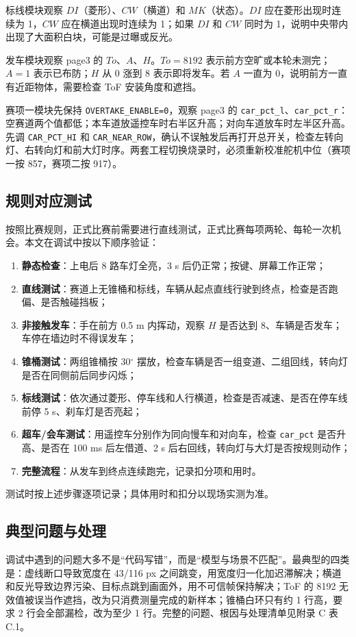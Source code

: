 \documentclass{MaiTechReport}
\begin{document}
标线模块观察 $DI$（菱形）、$CW$（横道）和 $MK$（状态）。$DI$ 应在菱形出现时连续为 1，$CW$ 应在横道出现时连续为 1；如果 $DI$ 和 $CW$ 同时为 1，说明中央带内出现了大面积白块，可能是过曝或反光。

发车模块观察 page3 的 $To$、$A$、$H$。$To=8192$ 表示前方空旷或本轮未测完；$A=1$ 表示已布防；$H$ 从 0 涨到 8 表示即将发车。若 $A$ 一直为 0，说明前方一直有近距物体，需要检查 ToF 安装角度和遮挡。

赛项一模块先保持 \texttt{OVERTAKE\_ENABLE=0}，观察 page3 的 \texttt{car\_pct\_l}、\texttt{car\_pct\_r}：空赛道两个值都低；本车道放遥控车时右半区升高；对向车道放车时左半区升高。先调 \texttt{CAR\_PCT\_HI} 和 \texttt{CAR\_NEAR\_ROW}，确认不误触发后再打开总开关，检查左转向灯、右转向灯和前大灯时序。两套工程切换烧录时，必须重新校准舵机中位（赛项一按 857，赛项二按 917）。

\subsection{规则对应测试}
按照比赛规则，正式比赛前需要进行直线测试，正式比赛每项两轮、每轮一次机会。本文在调试中按以下顺序验证：
\begin{enumerate}
  \item \textbf{静态检查}：上电后 8 路车灯全亮，3 s 后仍正常；按键、屏幕工作正常；
  \item \textbf{直线测试}：赛道上无锥桶和标线，车辆从起点直线行驶到终点，检查是否跑偏、是否触碰挡板；
  \item \textbf{非接触发车}：手在前方 0.5 m 内挥动，观察 $H$ 是否达到 8、车辆是否发车；车停在墙边时不得误发车；
  \item \textbf{锥桶测试}：两组锥桶按 30$^\circ$ 摆放，检查车辆是否一组变道、二组回线，转向灯是否在同侧前后同步闪烁；
  \item \textbf{标线测试}：依次通过菱形、停车线和人行横道，检查是否减速、是否在停车线前停 5 s、刹车灯是否亮起；
  \item \textbf{超车/会车测试}：用遥控车分别作为同向慢车和对向车，检查 \texttt{car\_pct} 是否升高、是否在 100 ms 后左借道、2 s 后右回线，转向灯与大灯是否按规则动作；
  \item \textbf{完整流程}：从发车到终点连续跑完，记录扣分项和用时。
\end{enumerate}

测试时按上述步骤逐项记录；具体用时和扣分以现场实测为准。



\subsection{典型问题与处理}
调试中遇到的问题大多不是“代码写错”，而是“模型与场景不匹配”。最典型的四类是：虚线断口导致宽度在 43/116 px 之间跳变，用宽度归一化加迟滞解决；横道和反光导致边界污染、目标点跳到画面外，用不可信帧保持解决；ToF 的 8192 无效值被误当作遮挡，改为只消费测量完成的新样本；锥桶白环只有约 1 行高，要求 2 行会全部漏检，改为至少 1 行。完整的问题、根因与处理清单见附录 C 表 C.1。
\end{document}
